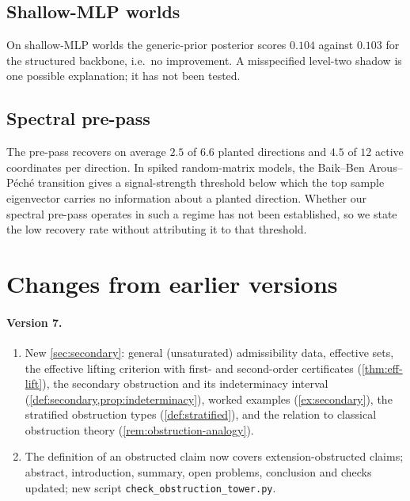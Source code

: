 \documentclass[11pt]{article}
\theoremstyle{definition}
\theoremstyle{remark}
\begin{document}
\subsection{Shallow-MLP worlds}
On shallow-MLP worlds the generic-prior posterior scores $0.104$ against $0.103$ for the structured
backbone, i.e.\ no improvement. A misspecified level-two shadow is one possible explanation; it has not been
tested.

\subsection{Spectral pre-pass}
The pre-pass recovers on average $2.5$ of $6.6$ planted directions and $4.5$ of $12$ active
coordinates per direction. In spiked random-matrix models, the Baik--Ben Arous--P\'ech\'e transition
\cite{BBP2005} gives a signal-strength threshold below which the top sample eigenvector carries no
information about a planted direction. Whether our spectral pre-pass operates in such a regime has
not been established, so we state the low recovery rate without attributing it to that threshold.

\section{Changes from earlier versions}\label{app:changes}

\paragraph{Version 7.}
\begin{enumerate}[leftmargin=*,label=(\alph*)]
\item New \cref{sec:secondary}: general (unsaturated) admissibility data, effective sets, the effective
  lifting criterion with first- and second-order certificates (\cref{thm:eff-lift}), the secondary
  obstruction and its indeterminacy interval (\cref{def:secondary,prop:indeterminacy}), worked examples
  (\cref{ex:secondary}), the stratified obstruction types (\cref{def:stratified}), and the relation to
  classical obstruction theory (\cref{rem:obstruction-analogy}).
\item The definition of an obstructed claim now covers extension-obstructed claims; abstract,
  introduction, summary, open problems, conclusion and checks updated; new script
  \texttt{check\_obstruction\allowbreak\_tower.py}.
\end{enumerate}
\end{document}
